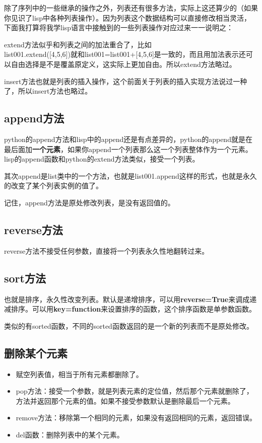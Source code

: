 \documentclass[12pt,oneside]{book}
\begin{document}
\begin{common-format}
除了序列中的一些继承的操作之外，列表还有很多方法，实际上这还算少的（如果你见识了lisp中各种列表操作）。因为列表这个数据结构可以直接修改相当灵活，下面我打算将我学lisp语言中接触到的一些列表操作对应过来一一说明之：

extend方法似乎和列表之间的加法重合了，比如\\list001.extend([4,5,6])就和list001=list001+[4,5,6]是一致的，而且用加法表示还可以自由选择是不是覆盖原定义，这实际上更加自由。所以extend方法略过。

insert方法也就是列表的插入操作，这个前面关于列表的插入实现方法说过一种了，所以insert方法也略过。

\subsection{append方法}
python的append方法和lisp中的append还是有点差异的，python的append就是在最后面加\textbf{一个元素}，如果你append一个列表那么这一个列表整体作为一个元素。lisp的append函数和python的extend方法类似，接受一个列表。

其次append是list类中的一个方法，也就是list001.append这样的形式，也就是永久的改变了某个列表实例的值了。

记住，append方法是原处修改列表，是没有返回值的。

\subsection{reverse方法}
reverse方法不接受任何参数，直接将一个列表永久性地翻转过来。

\subsection{sort方法}
也就是排序，永久性改变列表。默认是递增排序，可以用\textbf{reverse=True}来调成递减排序。可以用\textbf{key=function}来设置排序的函数，这个排序函数是单参数函数。

类似的有sorted函数，不同的sorted函数返回的是一个新的列表而不是原处修改。



\subsection{删除某个元素}
\begin{itemize}
\item 赋空列表值，相当于所有元素都删除了。 
\item pop方法：接受一个参数，就是列表元素的定位值，然后那个元素就删除了，方法并返回那个元素的值。如果不接受参数默认是删除最后一个元素。
\item remove方法：移除第一个相同的元素，如果没有返回相同的元素，返回错误。
\item del函数：删除列表中的某个元素。
\end{itemize}


\end{common-format}
\end{document}
